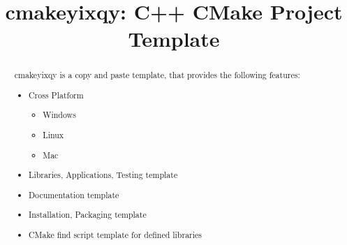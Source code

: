 \documentclass{article}
\begin{document}
\title{cmakeyixqy: C++ CMake Project Template}

\maketitle

\begin{abstract}
\noindent
cmakeyixqy is a copy and paste template, that provides the following features:

\begin{itemize}
  \item Cross Platform
  \begin{itemize}
    \item Windows
    \item Linux
    \item Mac
  \end{itemize}
  \item Libraries, Applications, Testing template
  \item Documentation template
  \item Installation, Packaging template
  \item CMake find script template for defined libraries
\end{itemize}

\end{abstract}

\setcounter{tocdepth}{2}
\tableofcontents

\newpage
\end{document}
